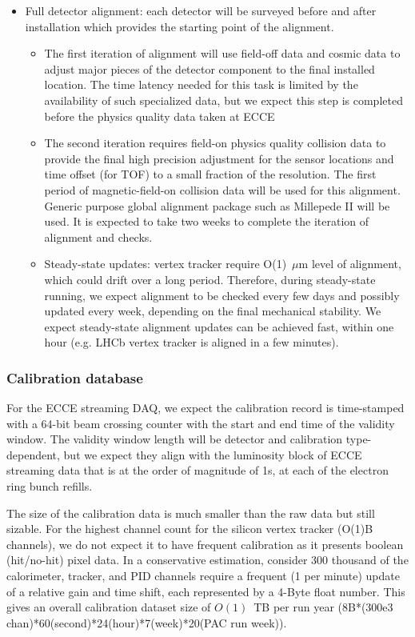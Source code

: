 \begin{itemize}
\item Full detector alignment: each detector will be surveyed before and after installation which provides the starting point of the alignment. 
\begin{itemize}
  \item The first iteration of alignment will use field-off data and cosmic data to adjust major pieces of the detector component to the final installed location. The time latency needed for this task is limited by the availability of such specialized data, but we expect this step is completed before the physics quality data taken at ECCE
  \item The second iteration requires field-on physics quality collision data to provide the final high precision adjustment for the sensor locations and time offset (for TOF) to a small fraction of the resolution. The first period of magnetic-field-on collision data will be used for this alignment. Generic purpose global alignment package such as Millepede II will be used. It is expected to take two weeks to complete the iteration of alignment and checks. 
  \item Steady-state updates: vertex tracker require O(1)~$\mu$m level of alignment, which could drift over a long period. Therefore, during steady-state running, we expect alignment to be checked every few days and possibly updated every week, depending on the final mechanical stability. We expect steady-state alignment updates can be achieved fast, within one hour (e.g. LHCb vertex tracker is aligned in a few minutes). 
\end{itemize}

\end{itemize}

\subsubsection{Calibration database}

For the ECCE streaming DAQ, we expect the calibration record is time-stamped with a 64-bit beam crossing counter with the start and end time of the validity window. The validity window length will be detector and calibration type-dependent, but we expect they align with the luminosity block of ECCE streaming data that is at the order of magnitude of 1s, at each of the electron ring bunch refills. 

The size of the calibration data is much smaller than the raw data but still sizable. For the highest channel count for the silicon vertex tracker (O(1)B channels), we do not expect it to have frequent calibration as it presents boolean (hit/no-hit) pixel data. In a conservative estimation, consider 300 thousand of the calorimeter, tracker, and PID channels require a frequent (1 per minute) update of a relative gain and time shift, each represented by a 4-Byte float number. This gives an overall calibration dataset size of $O(1)$~TB per run year (8B*(300e3 chan)*60(second)*24(hour)*7(week)*20(PAC run week)). 

